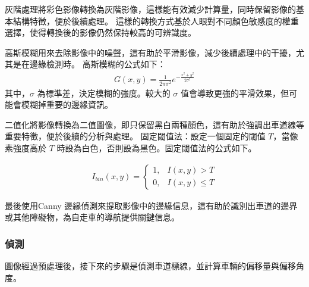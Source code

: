 \documentclass[12pt]{article}       %
\begin{document}
灰階處理將彩色影像轉換為灰階影像，這樣能有效減少計算量，同時保留影像的基本結構特徵，便於後續處理。
這樣的轉換方式基於人眼對不同顏色敏感度的權重選擇，使得轉換後的影像仍然保持較高的可辨識度。

高斯模糊用來去除影像中的噪聲，這有助於平滑影像，減少後續處理中的干擾，尤其是在邊緣檢測時。
高斯模糊的公式如下：
\begin{align}
G(x,y) = \frac{1}{2\pi\sigma^2} e^{-\frac{x^2 + y^2}{2\sigma^2}}
\end{align}
其中，$\sigma$ 為標準差，決定模糊的強度。較大的 $\sigma$ 值會導致更強的平滑效果，但可能會模糊掉重要的邊緣資訊。

二值化將影像轉換為二值圖像，即只保留黑白兩種顏色，這有助於強調出車道線等重要特徵，便於後續的分析與處理。
固定閾值法：設定一個固定的閾值 $T$，當像素強度高於 $T$ 時設為白色，否則設為黑色。固定閾值法的公式如下。

\begin{align}
    I_{bin}(x,y) = 
    \begin{cases}
        1, & I(x,y) > T \\
        0, & I(x,y) \leq T
    \end{cases}
\end{align}

最後使用Canny 邊緣偵測來提取影像中的邊緣信息，這有助於識別出車道的邊界或其他障礙物，為自走車的導航提供關鍵信息。

\subsubsection{偵測}
\hspace{2em}圖像經過預處理後，接下來的步驟是偵測車道標線，並計算車輛的偏移量與偏移角度。
\end{document}
